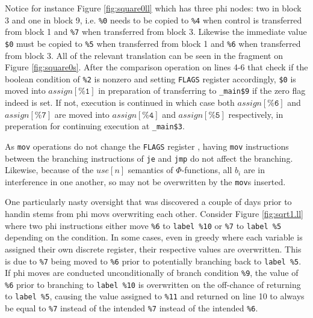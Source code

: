 \documentclass{article}
\begin{document}
\noindent Notice for instance Figure \ref{fig:square0ll} which has three phi nodes: two in  block 3 and one in block 9, i.e. \texttt{\%0} needs to be copied to \texttt{\%4} when control is transferred from block 1 and \texttt{\%7} when transferred from block 3. Likewise the immediate value \texttt{\$0} must be copied to \texttt{\%5} when transferred from block 1 and \texttt{\%6} when transferred from block 3.
All of the relevant translation can be seen in the fragment on Figure \ref{fig:square0s}. After the comparison operation on lines 4-6 that check if the boolean condition of \texttt{\%2} is nonzero and setting \texttt{FLAGS} register accordingly, \texttt{\$0} is moved into
\(\mathit{assign}[\texttt{\%1}]\) in preparation
of transferring to \texttt{\_main\$9} if the zero flag indeed is set. If not, execution is continued in which case both \(\mathit{assign}[\texttt{\%6}]\) and \(\mathit{assign}[\texttt{\%7}]\) are moved into \(\mathit{assign}[\texttt{\%4}]\) and \(\mathit{assign}[\texttt{\%5}]\) respectively, in preperation for continuing execution at \texttt{\_main\$3}.

As \texttt{mov} operations do not change the \texttt{FLAGS} register \cite{x86asm}, having \texttt{mov} instructions between the branching instructions of \texttt{je} and \texttt{jmp} do not affect the branching. Likewise, because of the \(\mathit{use}[n]\) semantics of \(\Phi\)-functions, all \(b_i\) are in interference in one another, so may not be overwritten by the \texttt{mov}s inserted.

One particularly nasty oversight that was discovered a couple of days prior to handin stems from phi movs overwriting each other.
Consider Figure \ref{fig:sqrt1.ll} where two phi instructions either move \texttt{\%6} to \texttt{label \%10} or \texttt{\%7} to \texttt{label \%5} depending on the condition. In some cases, even in greedy where each variable is assigned their own discrete register, their respective values are overwritten. This is due to \texttt{\%7} being moved to \texttt{\%6} prior to potentially branching back to \texttt{label \%5}. If phi moves are conducted unconditionally of branch condition \texttt{\%9}, the value of \texttt{\%6} prior to branching to \texttt{label \%10} is overwritten on the off-chance of returning to \texttt{label \%5}, causing the value assigned to \texttt{\%11} and returned on line 10 to always be equal to \texttt{\%7} instead of the intended \texttt{\%7} instead of the intended  \texttt{\%6}.
\end{document}
